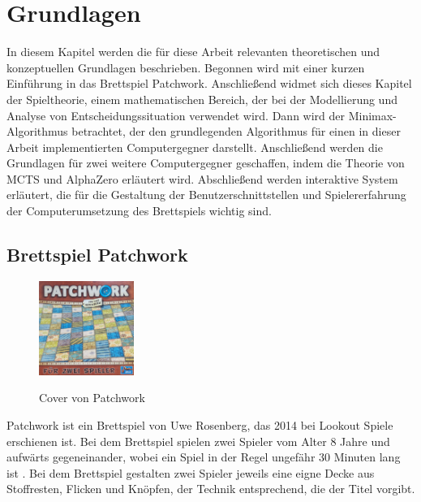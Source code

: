 \chapter{Grundlagen}
\label{chapter:grundlagen}

In diesem Kapitel werden die für diese Arbeit relevanten theoretischen und konzeptuellen Grundlagen beschrieben. Begonnen wird mit einer kurzen Einführung in das Brettspiel Patchwork. Anschließend widmet sich dieses Kapitel der Spieltheorie, einem mathematischen Bereich, der bei der Modellierung und Analyse von Entscheidungssituation verwendet wird. Dann wird der Minimax-Algorithmus betrachtet, der den grundlegenden Algorithmus für einen in dieser Arbeit implementierten Computergegner darstellt. Anschließend werden die Grundlagen für zwei weitere Computergegner geschaffen, indem die Theorie von \acl{MCTS} und AlphaZero erläutert wird. Abschließend werden interaktive System erläutert, die für die Gestaltung der Benutzerschnittstellen und Spielererfahrung der Computerumsetzung des Brettspiels wichtig sind.

\section{Brettspiel Patchwork}
\label{chapter:brettspiel-patchwork}

\begin{figure}
    \centering
    \vspace*{-1.25cm}
    \vspace*{-0.75cm}
    \includegraphics[width=0.275\textwidth]{res/pictures/assets/patchwork-cover.png}
    \caption[Cover von Patchwork]{\unskip}
    Cover von Patchwork
    \label{fig:patchwork-cover}
    \vspace*{-0.75cm}
\end{figure}

Patchwork ist ein Brettspiel von Uwe Rosenberg, das 2014 bei Lookout Spiele erschienen ist. Bei dem Brettspiel spielen zwei Spieler vom Alter 8 Jahre und aufwärts gegeneinander, wobei ein Spiel in der Regel ungefähr 30 Minuten lang ist \cite{LookoutSpielePatchwork}. Bei dem Brettspiel gestalten zwei Spieler jeweils eine eigne Decke aus Stoffresten, Flicken und Knöpfen, der Technik entsprechend, die der Titel vorgibt. \cite{SpielDesJahresPatchwork}

